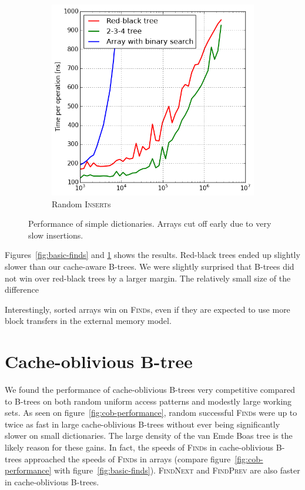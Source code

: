 \begin{figure}
\centering
\begin{subfigure}[t]{0.45\textwidth}
	\includegraphics[width=\textwidth]{img/performance/basic-random-insert}
	\caption{Random \textsc{Insert}s}
\end{subfigure}
\caption{Performance of simple dictionaries. Arrays cut off early due to very
	slow insertions.}
\label{fig:basic-perf}
\end{figure}

Figures~\ref{fig:basic-finds} and \ref{fig:basic-perf} shows the results.
Red-black trees ended up slightly slower than our cache-aware B-trees.
We were slightly surprised that B-trees did not win over red-black
trees by a larger margin. The relatively small size of the difference

Interestingly, sorted arrays win on \textsc{Find}s, even if they are expected
to use more block transfers in the external memory model.

\section{Cache-oblivious B-tree}
\label{sec:cob-perf}
We found the performance of cache-oblivious B-trees very competitive compared
to B-trees on both random uniform access patterns and modestly large working
sets. As seen on figure~\ref{fig:cob-performance}, random successful
\textsc{Find}s were up to twice as fast in large cache-oblivious B-trees
without ever being significantly slower on small dictionaries.
The large density of the van Emde Boas tree is the likely reason for these
gains. In fact, the speeds of \textsc{Find}s in cache-oblivious B-trees
approached the speeds of \textsc{Find}s in arrays (compare
figure~\ref{fig:cob-performance} with figure~\ref{fig:basic-finds}).
\textsc{FindNext} and \textsc{FindPrev} are also faster in cache-oblivious
B-trees.

